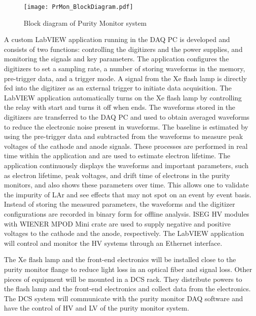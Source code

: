 \begin{figure}[h]
	\centering
	\texttt{[image: PrMon\_BlockDiagram.pdf]}
	\caption{Block diagram of Purity Monitor system}
	\label{fig:diagram}
\end{figure}

A custom LabVIEW application running in the DAQ PC is developed and consists of two functions: controlling the digitizers and the power supplies, and monitoring the signals and key parameters. The application configures the digitizers to set a sampling rate, a number of storing waveforms in the memory, pre-trigger data, and a trigger mode. A signal from the Xe flash lamp is directly fed into the digitizer as an external trigger to initiate data acquisition. The LabVIEW application automatically turns on the Xe flash lamp by controlling the relay with start and turns it off when ends. The waveforms stored in the digitizers are transferred to the DAQ PC and used to obtain averaged waveforms to reduce the electronic noise present in waveforms. The baseline is estimated by using the pre-trigger data and subtracted from the waveforms to measure peak voltages of the cathode and anode signals. These processes are performed in real time within the application and are used to estimate electron lifetime. The application continuously displays the waveforms and important parameters, such as electron lifetime, peak voltages, and drift time of electrons in the purity monitors, and also shows these parameters over time. This allows one to validate the impurity of LAr and see effects that may not spot on an event by event basis. Instead of storing the measured parameters, the waveforms and the digitizer configurations are recorded in binary form for offline analysis. ISEG HV modules with WIENER MPOD Mini crate are used to supply negative and positive voltages to the cathode and the anode, respectively. The LabVIEW application will control and monitor the HV systems through an Ethernet interface.  

The Xe flash lamp and the front-end electronics will be installed close to the purity monitor flange to reduce light loss in an optical fiber and signal loss. Other pieces of equipment will be mounted in a DCS rack. They distribute powers to the flash lamp and the front-end electronics and collect data from the electronics. The DCS system will communicate with the purity monitor DAQ software and have the control of HV and LV of the purity monitor system. 

